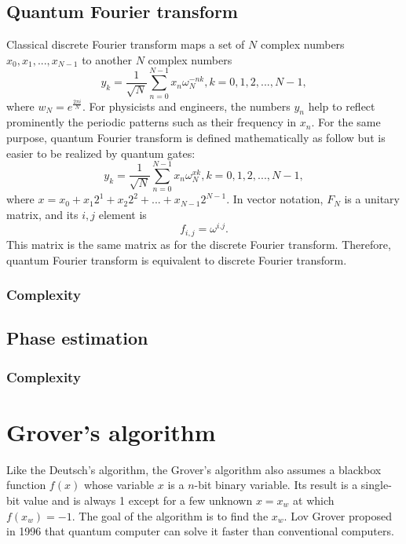 \documentclass[oneside, letter, 12pt]{book}
\begin{document}
\subsection{Quantum Fourier transform}
Classical discrete Fourier transform maps a set of $N$ complex numbers ${x_0, x_1, ..., x_{N-1}}$ to another $N$ complex numbers
\begin{equation}
    y_k = \frac 1 {\sqrt{N}} \sum^{N-1}_{n=0} x_n\omega_{N}^{-nk}, k = 0, 1, 2, ..., N-1,
\end{equation}
where $w_N = e^{\frac {2\pi i} N }$. For physicists and engineers, the numbers ${y_n}$ help to reflect prominently the periodic patterns such as their frequency in $x_n$. For the same purpose, quantum Fourier transform is defined mathematically as follow but is easier to be realized by quantum gates:
\begin{equation}
    y_k = \frac 1 {\sqrt{N}} \sum^{N-1}_{n=0} x_n\omega_{N}^{xk}, k = 0, 1, 2, ..., N-1,
\end{equation}
where $x = x_0 + x_1 2^1 + x_2 2^2 + ... +x_{N-1} 2^{N-1}$. In vector notation, $F_N$ is a unitary matrix, and its $i, j$ element is
\begin{equation}
    f_{i,j} = \omega^{i.j}.
\end{equation}
This matrix is the same matrix as for the discrete Fourier transform. Therefore, quantum Fourier transform is equivalent to discrete Fourier transform.

\subsubsection{Complexity}

\subsection{Phase estimation}
\subsubsection{Complexity}

\section{Grover's algorithm}
Like the Deutsch's algorithm, the Grover's algorithm also assumes a blackbox function $f(x)$ whose variable $x$ is a $n$-bit binary variable. Its result is a single-bit value and is always 1 except for a few unknown $x=x_w$ at which $f(x_w)=-1$. The goal of the algorithm is to find the $x_w$. Lov Grover proposed in 1996 that quantum computer can solve it faster than conventional computers.
\end{document}
